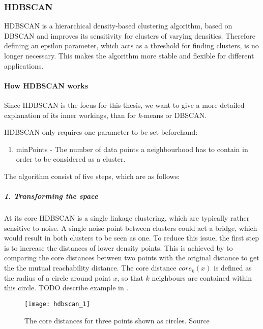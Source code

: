 \subsubsection{HDBSCAN}
\label{subsubsec:3_hdbscan}

HDBSCAN is a hierarchical density-based clustering algorithm\cite{McInnes2017},
based on DBSCAN and improves its sensitivity for clusters of varying densities.
Therefore defining an epsilon parameter, which acts as a threshold for finding clusters, is no longer necessary.
This makes the algorithm more stable and flexible for different applications.

\paragraph{How HDBSCAN works}
Since HDBSCAN is the focus for this thesis, we want to give a more detailed explanation of its inner workings,
than for \textit{k}-means or DBSCAN.

HDBSCAN only requires one parameter to be set beforehand:

\begin{enumerate}
    \item minPoints - The number of data points a neighbourhood has to contain in order to be considered as a cluster.
\end{enumerate}

The algorithm consist of five steps, which are as follows: 

\subparagraph{1. Transforming the space}
At its core HDBSCAN is a single linkage clustering, which are typically rather sensitive to noise.
A single noise point between clusters could act a bridge, which would result in both clusters to be seen as one.
To reduce this issue, the first step is to increase the distances of lower density points.
This is achieved by to comparing the core distances between two points with the original distance
to get the the mutual reachability distance.
The core distance $core_k(x)$ is defined as the radius of a circle around point $x$,
so that $k$ neighbours are contained within this circle.
TODO describe example in .

\begin{figure}[h]
    \centering
    \texttt{[image: hdbscan\_1]}
    \caption{
        The core distances for three points shown as circles.
        Source\cite{how_hdbscan_works}
    }
    \label{fig:hdbscan_1}
\end{figure}

